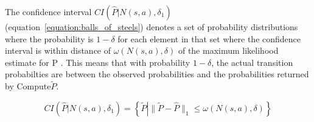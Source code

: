 The confidence interval $CI(\hat{P} | N(s, a), \delta_1)$
(equation~\eqref{equation:balls_of_steels}) denotes a set of probability
distributions where the probability is $1 - \delta$ for each element in that
set where the confidence interval is within distance of $\omega(N(s,a),\delta)$
of the maximum likelihood estimate for P \parencite{dietterich2013pac}. This
means that with probability $1-\delta$, the actual transition probabilties are
between the observed probabilities and the probabilities returned by
Compute$\tilde{P}$.


\begin{equation}
\label{equation:balls_of_steels}
CI(\hat{P} | N(s, a), \delta_1)  = \left\{\tilde{P} \left| \|\tilde{P} - \hat{P}\|_1 \le \omega(N(s,a), \delta)\right.\right\}
\end{equation}

\label{goto}
